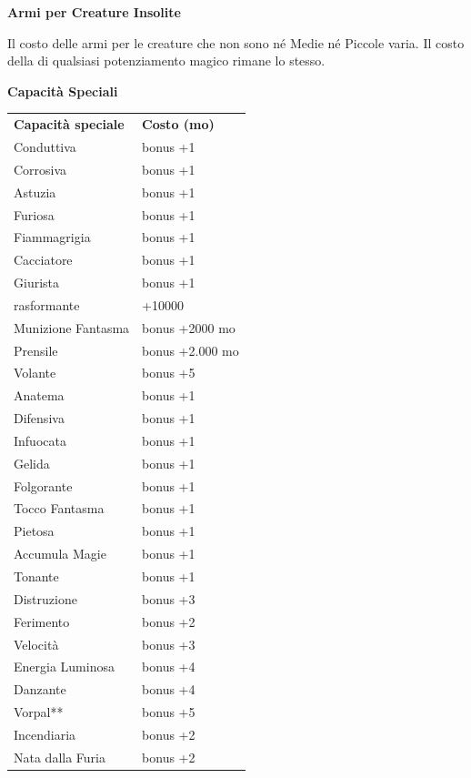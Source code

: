 \documentclass[a4paper,11pt,twoside,openany]{book}
\begin{document}
\textbf{Armi per Creature Insolite}

Il costo delle armi per le creature che non sono né Medie né Piccole varia. Il costo della di qualsiasi potenziamento magico rimane lo stesso.

\bigskip

\textbf{Capacità Speciali}

\bigskip

\begin{tabular}{ll}
	\toprule
	\textbf{Capacità speciale}    & \textbf{Costo (mo)}\\
	Conduttiva \index{Conduttiva} & bonus +1\\
	Corrosiva\index{Corrosiva}    & bonus +1\\
	Astuzia \index{Astuzia}       & bonus +1\\
	Furiosa \index{Furiosa}       & bonus +1\\
	Fiammagrigia \index{Fiammagrigia}             & bonus +1\\
	Cacciatore \index{Cacciatore} & bonus +1\\
	Giurista \index{Giurista}     & bonus +1\\
	rasformante \index{Trasformante}              & +10000\\
	Munizione Fantasma \index{Munizione Fantasma} & bonus +2000 mo\\
	Prensile \index{Prensile}     & bonus +2.000 mo\\
	Volante \index{Volante}       & bonus +5\\
	Anatema\index{Anatema}        & bonus +1\\
	Difensiva\index{Difensiva}    & bonus +1\\
	Infuocata \index{Infuocata}   & bonus +1\\
	Gelida \index{Gelida}         & bonus +1\\
	Folgorante \index{Folgorante} & bonus +1\\
	Tocco Fantasma \index{Tocco Fantasma}         & bonus +1\\
	Pietosa \index{Pietosa}       & bonus +1\\
	Accumula Magie \index{Accumula Magie}         & bonus +1\\
	Tonante \index{Tonante}       & bonus +1\\
	Distruzione \index{Distruzione}               & bonus +3\\
	Ferimento \index{Ferimento}   & bonus +2\\
	Velocità \index{Velocita'}    & bonus +3\\
	Energia Luminosa \index{Energia Luminosa}     & bonus +4\\
	Danzante \index{Danzante}     & bonus +4\\
	Vorpal** \index{Vorpal}       & bonus +5\\
	Incendiaria \index{Incendiaria}               & bonus +2\\
	Nata dalla Furia \index{Nata dalla Furia}     & bonus +2\\
\end{tabular}
\end{document}
